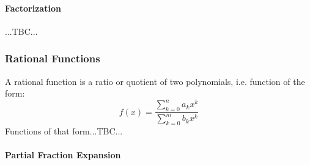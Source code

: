 


\paragraph{Factorization} ...TBC...

%
%
%  



\subsubsection{Rational Functions}
A rational function is a ratio or quotient of two polynomials, i.e. function of the form:
\begin{equation}
 f(x) = \frac{\sum_{k=0}^n a_k x^k}{\sum_{k=0}^m b_k x^k}
\end{equation}
Functions of that form...TBC...


\paragraph{Partial Fraction Expansion}



